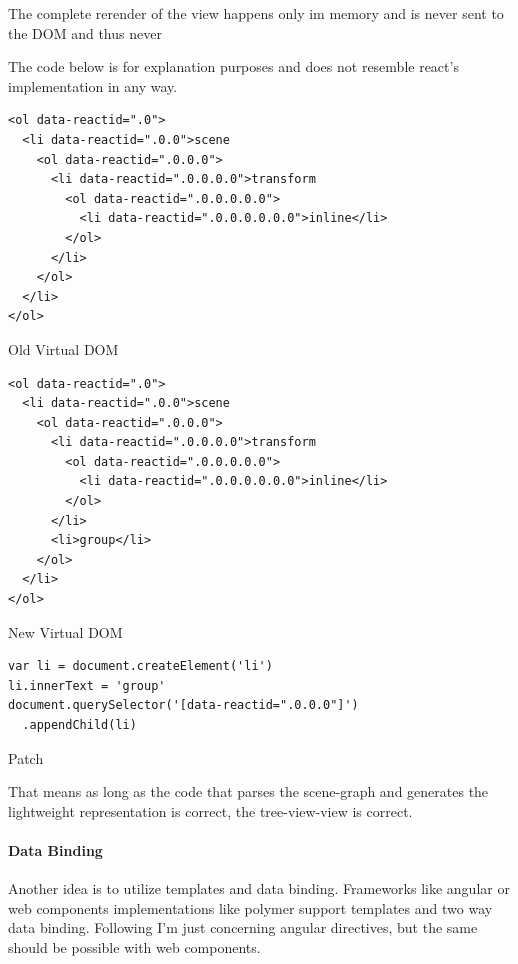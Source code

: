 The complete rerender of the view happens only im memory and is never
sent to the DOM and thus never

The code below is for explanation purposes and does not resemble react's
implementation in any way.

\begin{listing}[H]
  \begin{verbatim}
<ol data-reactid=".0">
  <li data-reactid=".0.0">scene
    <ol data-reactid=".0.0.0">
      <li data-reactid=".0.0.0.0">transform
        <ol data-reactid=".0.0.0.0.0">
          <li data-reactid=".0.0.0.0.0.0">inline</li>
        </ol>
      </li>
    </ol>
  </li>
</ol>
  \end{verbatim}
  \caption{Old Virtual DOM}
\end{listing}

\begin{listing}[H]
  \begin{verbatim}
<ol data-reactid=".0">
  <li data-reactid=".0.0">scene
    <ol data-reactid=".0.0.0">
      <li data-reactid=".0.0.0.0">transform
        <ol data-reactid=".0.0.0.0.0">
          <li data-reactid=".0.0.0.0.0.0">inline</li>
        </ol>
      </li>
      <li>group</li>
    </ol>
  </li>
</ol>
  \end{verbatim}
  \caption{New Virtual DOM}
\end{listing}

\begin{listing}[H]
  \begin{verbatim}
var li = document.createElement('li')
li.innerText = 'group'
document.querySelector('[data-reactid=".0.0.0"]')
  .appendChild(li)
  \end{verbatim}
  \caption{Patch}
\end{listing}

That means as long as the code that parses the scene-graph and generates
the lightweight representation is correct, the tree-view-view is
correct.

\paragraph{Data Binding}
\label{data-binding}

Another idea is to utilize templates and data binding. Frameworks like
angular or web components implementations like polymer
support templates and two way data binding. Following I'm just
concerning angular directives, but the same should be possible with web
components.

